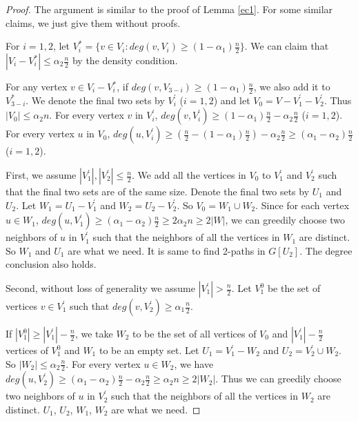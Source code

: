 \documentclass[11pt]{article}
\begin{document}
\begin{proof}
The argument is similar to the proof of Lemma \ref{ec1}. For some similar claims, we just give them without proofs.

For $i=1,2$, let $V_i^*=\{v\in V_i: deg(v,V_{i})\geq (1-\alpha_1)\frac{n}{2}\}$. We can claim that $|V_i-V_i^*|\leq \alpha_2\frac{n}{2}$ by the density condition.

For any vertex $v\in V_i-V_i^*$, if $deg(v,V_{3-i})\geq (1-\alpha_1)\frac{n}{2}$, we also add it to $V_{3-i}^*$. We denote the final two sets by $V_i^{'}$ ($i=1,2$) and let $V_0=V-V_1^{'}-V_2^{'}$. Thus $|V_0|\leq \alpha_2n$. For every vertex $v$ in $V_i^{'}$, $deg(v,V_i^{'})\geq (1-\alpha_1)\frac{n}{2}-\alpha_2\frac{n}{2}$ ($i=1,2$). For every vertex $u$ in $V_0$, $deg(u,V_i^{'})\geq (\frac{n}{2}-(1-\alpha_1)\frac{n}{2})-\alpha_2\frac{n}{2}\geq (\alpha_1-\alpha_2)\frac{n}{2}$ ($i=1,2$).

First, we assume $|V_1^{'}|,|V_2^{'}|\leq \frac{n}{2}$. We add all the vertices in $V_0$ to $V_1^{'}$ and $V_2^{'}$ such that the final two sets are of the same size. Denote the final two sets by $U_1$ and $U_2$. Let $W_1=U_1-V_1^{'}$ and $W_2=U_2-V_2^{'}$. So $V_0=W_1\cup W_2$. Since for each vertex $u\in W_1$, $deg(u,V_{1}^{'})\geq (\alpha_1-\alpha_2)\frac{n}{2}\geq 2\alpha_2n\geq 2|W|$, we can greedily choose two neighbors of $u$ in $V_1^{'}$ such that the neighbors of all the vertices in $W_1$ are distinct. So $W_1$ and $U_1$ are what we need. It is same to find 2-paths in $G[U_2]$. The degree conclusion also holds.

Second, without loss of generality we assume $|V_1^{'}|>\frac{n}{2}$. Let $V_1^0$ be the set of vertices $v\in V_1^{'}$ such that $deg(v,V_2^{'})\geq \alpha_1\frac{n}{2}$.

If $|V_1^0|\geq |V_1^{'}|-\frac{n}{2}$, we take $W_2$ to be the set of all vertices of $V_0$ and $|V_1^{'}|-\frac{n}{2}$ vertices of $V_1^0$ and $W_1$ to be an empty set. Let $U_1=V_1^{'}-W_2$ and $U_2=V_2^{'}\cup W_2$. So $|W_2|\leq \alpha_2\frac{n}{2}$. For every vertex $u\in W_2$, we have $deg(u,V_2^{'})\geq (\alpha_1-\alpha_2)\frac{n}{2}-\alpha_2\frac{n}{2}\geq \alpha_2n\geq 2|W_2|$. Thus we can greedily choose two neighbors of $u$ in $V_2^{'}$ such that the neighbors of all the vertices in $W_2$ are distinct. $U_1$, $U_2$, $W_1$, $W_2$ are what we need.


\end{proof}
\end{document}
